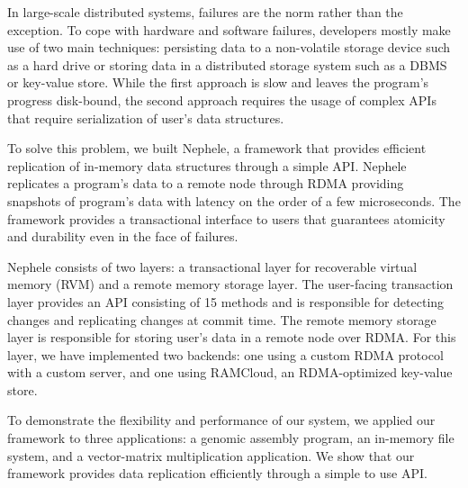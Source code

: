 In large-scale distributed systems, failures are the norm rather than the
exception. To cope with hardware and software failures, developers mostly make
use of two main techniques: persisting data to a non-volatile storage device
such as a hard drive or storing data in a distributed storage system such as a
DBMS or key-value store. While the first approach is slow and leaves the
program's progress disk-bound, the second approach requires the usage of
complex APIs that require serialization of user's data structures.

To solve this problem, we built Nephele, a framework that provides efficient
replication of in-memory data structures through a simple API. Nephele
replicates a program's data to a remote node through RDMA providing snapshots
of program's data with latency on the order of a few microseconds. The
framework provides a transactional interface to users that guarantees atomicity
and durability even in the face of failures.

Nephele consists of two layers: a transactional layer for recoverable virtual
memory (RVM) and a remote memory storage layer. The user-facing transaction
layer provides an API consisting of 15 methods and is responsible for detecting
changes and replicating changes at commit time. The remote memory storage layer
is responsible for storing user's data in a remote node over RDMA. For this
layer, we have implemented two backends: one using a custom RDMA protocol with
a custom server, and one using RAMCloud, an RDMA-optimized key-value store.

To demonstrate the flexibility and performance of our system, we applied our
framework to three applications: a genomic assembly program, an in-memory file
system, and a vector-matrix multiplication application.  We show that our
framework provides data replication efficiently through a simple to use API.

